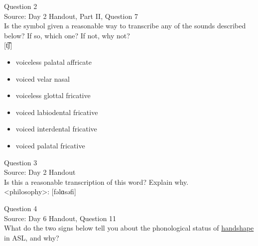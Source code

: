 \documentclass[12pt]{article}
\begin{document}
\newpage

{\large Question 2}\\

Source: Day 2 Handout, Part II, Question 7\\

Is the symbol given a reasonable way to transcribe any of the sounds described below? If so, which one? If not, why not?\\

{[t͡ʃ]}

\begin{itemize} \item voiceless palatal affricate \item voiced velar nasal \item voiceless glottal fricative \item voiced labiodental fricative \item voiced interdental fricative \item voiced palatal fricative \end{itemize}


\newpage

{\large Question 3}\\

Source: Day 2 Handout\\

Is this a reasonable transcription of this word? Explain why.\\

<philosophy>: {[fəlɑsəfi]}


\newpage

{\large Question 4}\\

Source: Day 6 Handout, Question 11\\

What do the two signs below tell you about the phonological status of \underline{handshape} in ASL, and why?\\
\end{document}
